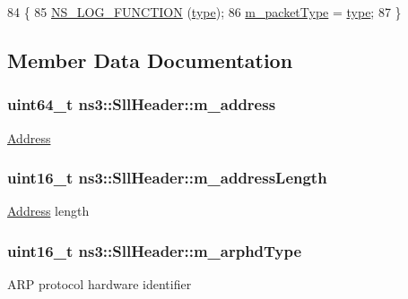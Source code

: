 \begin{DoxyCode}
84 \{
85   \hyperlink{log-macros-disabled_8h_a90b90d5bad1f39cb1b64923ea94c0761}{NS\_LOG\_FUNCTION} (\hyperlink{visualizer-ideas_8txt_add98db9e15e2a58cf2b57623e7aa893a}{type});
86   \hyperlink{classns3_1_1SllHeader_a52acf6bb601a147c066bd73cec97ba64}{m\_packetType} = \hyperlink{visualizer-ideas_8txt_add98db9e15e2a58cf2b57623e7aa893a}{type};
87 \}
\end{DoxyCode}


\subsection{Member Data Documentation}
\subsubsection[{\texorpdfstring{m\+\_\+address}{m_address}}]{\setlength{\rightskip}{0pt plus 5cm}uint64\+\_\+t ns3\+::\+Sll\+Header\+::m\+\_\+address\hspace{0.3cm}{\ttfamily [protected]}}\hypertarget{classns3_1_1SllHeader_ada29265e04323c912dda5fd15945a883}{}\label{classns3_1_1SllHeader_ada29265e04323c912dda5fd15945a883}
\hyperlink{classns3_1_1Address}{Address} 
\subsubsection[{\texorpdfstring{m\+\_\+address\+Length}{m_addressLength}}]{\setlength{\rightskip}{0pt plus 5cm}uint16\+\_\+t ns3\+::\+Sll\+Header\+::m\+\_\+address\+Length\hspace{0.3cm}{\ttfamily [protected]}}\hypertarget{classns3_1_1SllHeader_a41619d8a4f1011d78340d8c88cfd1dbf}{}\label{classns3_1_1SllHeader_a41619d8a4f1011d78340d8c88cfd1dbf}
\hyperlink{classns3_1_1Address}{Address} length 
\subsubsection[{\texorpdfstring{m\+\_\+arphd\+Type}{m_arphdType}}]{\setlength{\rightskip}{0pt plus 5cm}uint16\+\_\+t ns3\+::\+Sll\+Header\+::m\+\_\+arphd\+Type\hspace{0.3cm}{\ttfamily [protected]}}\hypertarget{classns3_1_1SllHeader_a9c84d8f55665f2dee31b701625d0bc46}{}\label{classns3_1_1SllHeader_a9c84d8f55665f2dee31b701625d0bc46}
A\+RP protocol hardware identifier 
